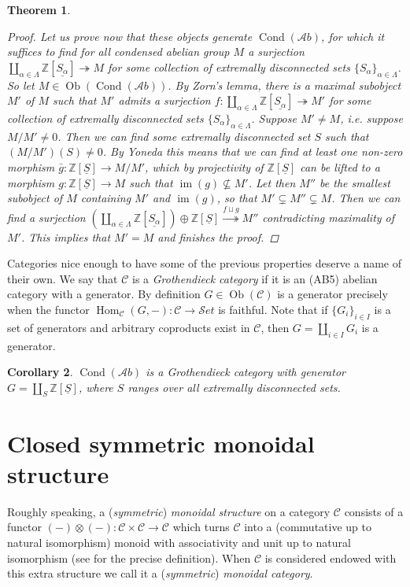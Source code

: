 \documentclass[11pt,A4]{article}
\theoremstyle{plain}
\newtheorem{thm}{Theorem}[section]
\newtheorem{cor}[thm]{Corollary}
\theoremstyle{definition}
\theoremstyle{remark}
\newcommand{\Z}{\mathbb{Z}}
\newcommand{\1}{\mathbbm{1}}
\newcommand{\scrC}{\mathscr{C}}
\newcommand{\Ab}{\mathscr{A}b}
\newcommand{\Set}{\mathscr{S}et}
\DeclareMathOperator{\Hom}{Hom}
\DeclareMathOperator{\Cond}{Cond}
\DeclareMathOperator{\Ob}{Ob}
\DeclareMathOperator{\im}{im}
\renewcommand{\u}[1]{\underline{#1}}
\newcommand{\ot}{\otimes}
\newcommand{\op}{\oplus}
\begin{document}
\begin{thm}
\begin{proof}
	Let us prove now that these objects generate $\Cond(\Ab)$, for which it suffices to find for all condensed abelian group $M$ a surjection $\coprod_{\alpha \in \Lambda}\Z[\u{S_{\alpha}}]\twoheadrightarrow M$ for some collection of extremally disconnected sets $\{S_{\alpha}\}_{\alpha\in \Lambda}$.
	So let $M\in \Ob(\Cond(\Ab))$.
	By Zorn's lemma, there is a maximal subobject $M'$ of $M$ such that $M'$ admits a surjection $f\colon \coprod_{\alpha\in \Lambda}\Z[\u{S_{\alpha}}]\twoheadrightarrow M'$ for some collection of extremally disconnected sets $\{S_{\alpha}\}_{\alpha\in \Lambda}$.
	Suppose $M'\neq M$, i.e. suppose $M/M'\neq 0$.
	Then we can find some extremally disconnected set $S$ such that $(M/M')(S)\neq 0$.
	By Yoneda this means that we can find at least one non-zero morphism $\bar{g}\colon \Z[\u{S}]\to M/M'$, which by projectivity of $\Z[\u{S}]$ can be lifted to a morphism $g\colon \Z[\u{S}]\to M$ such that $\im(g)\not\subseteq M'$.
	Let then $M''$ be the smallest subobject of $M$ containing $M'$ and $\im(g)$, so that $M'\subsetneq M''\subsetneq M$.
	Then we can find a surjection $(\coprod_{\alpha\in \Lambda} \Z[\u{S_{\alpha}}])\op \Z[\u{S}]\overset{f\sqcup g}{\twoheadrightarrow} M''$ contradicting maximality of $M'$.
	This implies that $M'=M$ and finishes the proof.
    \end{proof}
\end{thm}

Categories nice enough to have some of the previous properties deserve a name of their own.
We say that $\scrC$ is a \textit{Grothendieck category} if it is an (AB5) abelian category with a generator.
By definition $G\in \Ob(\scrC)$ is a generator precisely when the functor $\Hom_{\scrC}(G,-)\colon \scrC\to \Set$ is faithful.
Note that if $\{G_{i}\}_{i\in I}$ is a set of generators and arbitrary coproducts exist in $\scrC$, then $G=\coprod_{i\in I}G_{i}$ is a generator.

\begin{cor}
    $\Cond(\Ab)$ is a Grothendieck category with generator $G=\coprod_{S}\Z[\u{S}]$, where $S$ ranges over all extremally disconnected sets.
\end{cor}

\section{Closed symmetric monoidal structure}

Roughly speaking, a (\textit{symmetric}) \textit{monoidal structure} on a category $\scrC$ consists of a functor $(-)\ot(-)\colon \scrC\times \scrC\to \scrC$ which turns $\scrC$ into a (commutative up to natural isomorphism) monoid with associativity and unit up to natural isomorphism (see \cite{nlab:monoidal_category} for the precise definition).
When $\scrC$ is considered endowed with this extra structure we call it a (\textit{symmetric}) \textit{monoidal category}.
\end{document}
